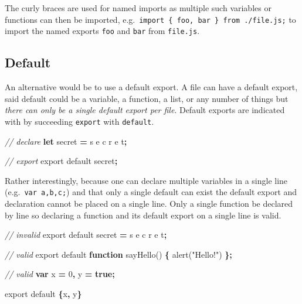 \documentclass[
]{krantz}
\makeatletter
\newenvironment{Shaded}{\begin{snugshade}}{\end{snugshade}}
\newcommand{\AttributeTok}[1]{\textcolor[rgb]{0.61,0.61,0.61}{#1}}
\newcommand{\CommentTok}[1]{\textcolor[rgb]{0.37,0.37,0.37}{\textit{#1}}}
\newcommand{\DecValTok}[1]{\textcolor[rgb]{0.06,0.06,0.06}{#1}}
\newcommand{\ImportTok}[1]{#1}
\newcommand{\KeywordTok}[1]{\textcolor[rgb]{0.27,0.27,0.27}{\textbf{#1}}}
\newcommand{\NormalTok}[1]{#1}
\newcommand{\OperatorTok}[1]{\textcolor[rgb]{0.43,0.43,0.43}{\textbf{#1}}}
\newcommand{\StringTok}[1]{\textcolor[rgb]{0.5,0.5,0.5}{#1}}
\newenvironment{kframe}{%
\medskip{}
\setlength{\fboxsep}{.8em}
 \def\at@end@of@kframe{}%
 \ifinner\ifhmode%
  \def\at@end@of@kframe{\end{minipage}}%
  \begin{minipage}{\columnwidth}%
 \fi\fi%
 \def\FrameCommand##1{\hskip\@totalleftmargin \hskip-\fboxsep
 \colorbox{shadecolor}{##1}\hskip-\fboxsep
     \hskip-\linewidth \hskip-\@totalleftmargin \hskip\columnwidth}%
 \MakeFramed {\advance\hsize-\width
   \@totalleftmargin\z@ \linewidth\hsize
   \@setminipage}}%
 {\par\unskip\endMakeFramed%
 \at@end@of@kframe}
\renewenvironment{Shaded}{\begin{kframe}}{\end{kframe}}
\makeatother
\begin{document}
The curly braces are used for named imports as multiple such variables or functions can then be imported, e.g.~\texttt{import\ \{\ foo,\ bar\ \}\ from\ \textquotesingle{}./file.js\textquotesingle{};} to import the named exports \texttt{foo} and \texttt{bar} from \texttt{file.js}.

\hypertarget{webpack-intro-import-export-default}{%
\subsection{Default}\label{webpack-intro-import-export-default}}

An alternative would be to use a default export. A file can have a default export, said default could be a variable, a function, a list, or any number of things but \emph{there can only be a single default export per file}. Default exports are indicated with by succeeding \texttt{export} with \texttt{default}.

\begin{Shaded}
\begin{Highlighting}[]
\CommentTok{// declare}
\KeywordTok{let}\NormalTok{ secret }\OperatorTok{=} \StringTok{\textquotesingle{}s e c r e t\textquotesingle{}}\OperatorTok{;}

\CommentTok{// export}
\ImportTok{export} \ImportTok{default}\NormalTok{ secret}\OperatorTok{;}
\end{Highlighting}
\end{Shaded}

Rather interestingly, because one can declare multiple variables in a single line (e.g.~\texttt{var\ a,b,c;}) and that only a single default can exist the default export and declaration cannot be placed on a single line. Only a single function be declared by line so declaring a function and its default export on a single line is valid.

\begin{Shaded}
\begin{Highlighting}[]
\CommentTok{// invalid}
\ImportTok{export} \ImportTok{default}\NormalTok{ secret }\OperatorTok{=} \StringTok{\textquotesingle{}s e c r e t\textquotesingle{}}\OperatorTok{;}

\CommentTok{// valid}
\ImportTok{export} \ImportTok{default} \KeywordTok{function} \AttributeTok{sayHello}\NormalTok{() }\OperatorTok{\{}
  \AttributeTok{alert}\NormalTok{(}\StringTok{"Hello!"}\NormalTok{)}
\OperatorTok{\};}

\CommentTok{// valid}
\KeywordTok{var}\NormalTok{ x }\OperatorTok{=} \DecValTok{0}\OperatorTok{,}
\NormalTok{    y }\OperatorTok{=} \KeywordTok{true}\OperatorTok{;}

\ImportTok{export} \ImportTok{default} \OperatorTok{\{}\NormalTok{x}\OperatorTok{,}\NormalTok{ y}\OperatorTok{\}}
\end{Highlighting}
\end{Shaded}
\end{document}
